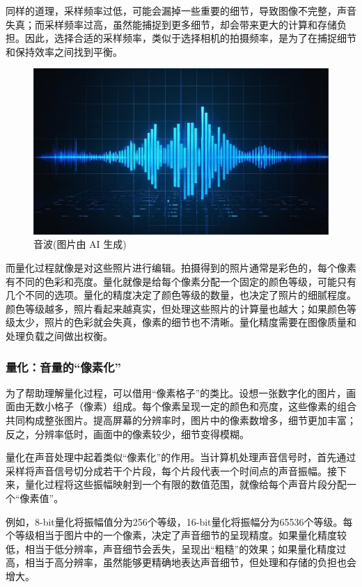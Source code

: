 同样的道理，采样频率过低，可能会漏掉一些重要的细节，导致图像不完整，声音失真；而采样频率过高，虽然能捕捉到更多细节，却会带来更大的计算和存储负担。因此，选择合适的采样频率，类似于选择相机的拍摄频率，是为了在捕捉细节和保持效率之间找到平衡。
\begin{figure}[htb]
	\centering
	\includegraphics[width=\linewidth]{image/4/音波.png}
	\caption{音波(图片由 AI 生成)}
\end{figure}
而量化过程就像是对这些照片进行编辑。拍摄得到的照片通常是彩色的，每个像素有不同的色彩和亮度。量化就像是给每个像素分配一个固定的颜色等级，可能只有几个不同的选项。量化的精度决定了颜色等级的数量，也决定了照片的细腻程度。颜色等级越多，照片看起来越真实，但处理这些照片的计算量也越大；如果颜色等级太少，照片的色彩就会失真，像素的细节也不清晰。量化精度需要在图像质量和处理负载之间做出权衡。

\subsubsection{量化：音量的“像素化”}

为了帮助理解量化过程，可以借用“像素格子”的类比。设想一张数字化的图片，画面由无数小格子（像素）组成。每个像素呈现一定的颜色和亮度，这些像素的组合共同构成整张图片。提高屏幕的分辨率时，图片中的像素数增多，细节更加丰富；反之，分辨率低时，画面中的像素较少，细节变得模糊。

量化在声音处理中起着类似“像素化”的作用。当计算机处理声音信号时，首先通过采样将声音信号切分成若干个片段，每个片段代表一个时间点的声音振幅。接下来，量化过程将这些振幅映射到一个有限的数值范围，就像给每个声音片段分配一个“像素值”。

例如，8-bit量化将振幅值分为256个等级，16-bit量化将振幅分为65536个等级。每个等级相当于图片中的一个像素，决定了声音细节的呈现精度。如果量化精度较低，相当于低分辨率，声音细节会丢失，呈现出“粗糙”的效果；如果量化精度过高，相当于高分辨率，虽然能够更精确地表达声音细节，但处理和存储的负担也会增大。


